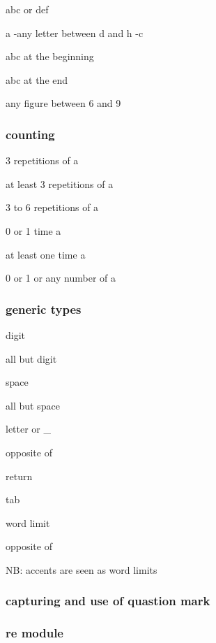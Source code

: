 			 abc or def

			 a -any letter between d and h -c

			 abc at the beginning

			 abc at the end

			\code{[6-9]} any figure between 6 and 9

			
		\subsubsection{counting}

			 3 repetitions of a

			  at least 3 repetitions of a

			 3 to 6 repetitions of a

			 0 or 1 time a

			 at least one time a

			 0 or 1 or any number of a



		\subsubsection{generic types}
			
			 digit

			 all but digit

			 space

			 all but space

			 letter or \_{}

			 opposite of  

			 return

			 tab

			 word limit

			 opposite of  

			NB: accents are seen as word limits


		\subsubsection{capturing and use of quastion mark}



		\subsubsection{re module}
		
